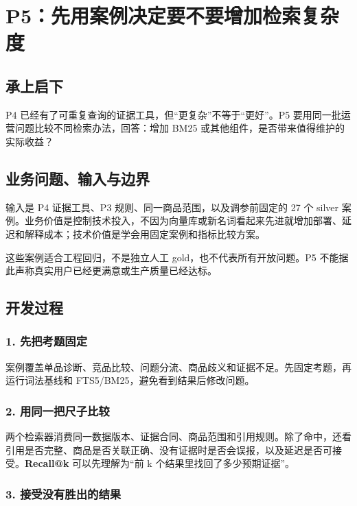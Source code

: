 \chapter{P5：先用案例决定要不要增加检索复杂度}

\section{承上启下}

P4 已经有了可重复查询的证据工具，但“更复杂”不等于“更好”。P5 要用同一批运营问题比较不同检索办法，回答：增加 BM25 或其他组件，是否带来值得维护的实际收益？

\section{业务问题、输入与边界}

输入是 P4 证据工具、P3 规则、同一商品范围，以及调参前固定的 27 个 silver 案例。业务价值是控制技术投入，不因为向量库或新名词看起来先进就增加部署、延迟和解释成本；技术价值是学会用固定案例和指标比较方案。

这些案例适合工程回归，不是独立人工 gold，也不代表所有开放问题。P5 不能据此声称真实用户已经更满意或生产质量已经达标。

\section{开发过程}

\subsection{1. 先把考题固定}

案例覆盖单品诊断、竞品比较、问题分流、商品歧义和证据不足。先固定考题，再运行词法基线和 FTS5/BM25，避免看到结果后修改问题。

\subsection{2. 用同一把尺子比较}

两个检索器消费同一数据版本、证据合同、商品范围和引用规则。除了命中，还看引用是否完整、商品是否关联正确、没有证据时是否会误报，以及延迟是否可接受。\textbf{Recall@k} 可以先理解为“前 k 个结果里找回了多少预期证据”。

\subsection{3. 接受没有胜出的结果}

